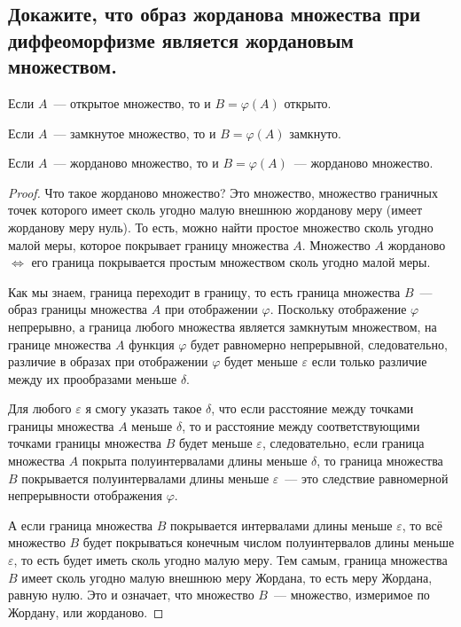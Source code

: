 
\subsection{Докажите, что образ жорданова множества при диффеоморфизме является жордановым множеством.}

Если $A$~--- открытое множество, то и $B = \varphi(A)$ открыто.

Если $A$~--- замкнутое множество, то и $B = \varphi(A)$ замкнуто.

\begin{theorem*}
    Если $A$~--- жорданово множество, то и $B = \varphi(A)$~--- жорданово множество.
\end{theorem*}
\begin{proof}
    Что такое жорданово множество? Это множество, множество граничных точек которого имеет сколь угодно малую внешнюю жорданову меру (имеет жорданову меру нуль). То есть, можно найти простое множество сколь угодно малой меры, которое покрывает границу множества $A$. Множество $A$ жорданово $\iff$ его граница покрывается простым множеством сколь угодно малой меры.
    
    Как мы знаем, граница переходит в границу, то есть граница множества $B$~--- образ границы множества $A$ при отображении $\varphi$. Поскольку отображение $\varphi$ непрерывно, а граница любого множества является замкнутым множеством, на границе множества $A$ функция $\varphi$ будет равномерно непрерывной, следовательно, различие в образах при отображении $\varphi$ будет меньше $\varepsilon$ если только различие между их прообразами меньше $\delta$.
    
    Для любого $\varepsilon$ я смогу указать такое $\delta$, что если расстояние между точками границы множества $A$ меньше $\delta$, то и расстояние между соответствующими точками границы множества $B$ будет меньше $\varepsilon$, следовательно, если граница множества $A$ покрыта полуинтервалами длины меньше $\delta$, то граница множества $B$ покрывается полуинтервалами длины меньше $\varepsilon$~--- это следствие равномерной непрерывности отображения $\varphi$.
    
    А если граница множества $B$ покрывается интервалами длины меньше $\varepsilon$, то всё множество $B$ будет покрываться конечным числом полуинтервалов длины меньше $\varepsilon$, то есть будет иметь сколь угодно малую меру. Тем самым, граница множества $B$ имеет сколь угодно малую внешнюю меру Жордана, то есть меру Жордана, равную нулю. Это и означает, что множество $B$~--- множество, измеримое по Жордану, или жорданово.
    
\end{proof}